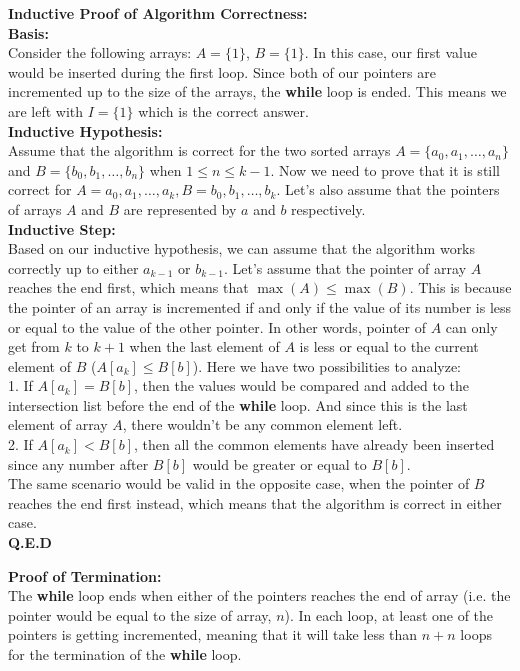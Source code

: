     \textbf{Inductive Proof of Algorithm Correctness:} \\
    \textbf{Basis:} \\
    Consider the following arrays: $A=\{1\}$, $B=\{1\}$. In this case, our first value would be inserted during the first loop. Since both of our pointers are incremented up to
    the size of the arrays, the \textbf{while} loop is ended. This means we are left with $I=\{1\}$ which is the correct answer. \\
    \textbf{Inductive Hypothesis:} \\
    Assume that the algorithm is correct for the two sorted arrays $A=\{a_0, a_1, \ldots, a_n\}$ and $B=\{b_0, b_1, \ldots, b_n\}$ when $1 \leq n \leq k-1$.
    Now we need to prove that it is still correct for $A={a_0, a_1, \ldots, a_k}, B={b_0, b_1, \ldots, b_k}$. Let's also assume that the pointers
    of arrays $A$ and $B$ are represented by $a$ and $b$ respectively. \\ 
    \textbf{Inductive Step:} \\
    Based on our inductive hypothesis, we can assume that the algorithm works correctly up to either $a_{k-1}$ or $b_{k-1}$. Let's assume that the pointer of 
    array $A$ reaches the end first, which means that $\max(A) \leq \max(B)$. This is because the pointer of an array is incremented if and only if the value of its number
    is less or equal to the value of the other pointer. In other words, pointer of $A$ can only get from $k$ to $k+1$ when the last element of $A$ is less or equal to
    the current element of $B$ ($A[a_k] \leq B[b]$). Here we have two possibilities to analyze: \\
    1. If $A[a_k] = B[b]$, then the values would be compared and added to the intersection list before the end of the \textbf{while} loop. And since this is the last element of
    array $A$, there wouldn't be any common element left. \\
    2. If $A[a_k] < B[b]$, then all the common elements have already been inserted since any number after $B[b]$ would be greater or equal to $B[b]$.\\
    The same scenario would be valid in the opposite case, when the pointer of $B$ reaches the end first instead, which means that the algorithm is correct in either case.\\
    \textbf{Q.E.D}

    \textbf{Proof of Termination:} \\
    The \textbf{while} loop ends when either of the pointers reaches the end of array (i.e. the pointer would be equal to the size of array, $n$). In each loop, at least one of the pointers is
    getting incremented, meaning that it will take less than $n+n$ loops for the termination of the \textbf{while} loop.

